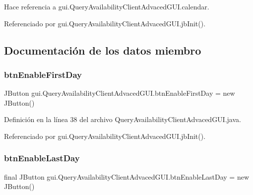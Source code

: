 Hace referencia a gui.\+Query\+Availability\+Client\+Advaced\+G\+U\+I.\+calendar.



Referenciado por gui.\+Query\+Availability\+Client\+Advaced\+G\+U\+I.\+jb\+Init().



\subsection{Documentación de los datos miembro}
\mbox{\label{classgui_1_1_query_availability_client_advaced_g_u_i_a8e949d79027650d99ede8ae5b7c59887}} 
\subsubsection{\texorpdfstring{btnEnableFirstDay}{btnEnableFirstDay}}
{\footnotesize\ttfamily J\+Button gui.\+Query\+Availability\+Client\+Advaced\+G\+U\+I.\+btn\+Enable\+First\+Day = new J\+Button()\hspace{0.3cm}{\ttfamily [private]}}



Definición en la línea 38 del archivo Query\+Availability\+Client\+Advaced\+G\+U\+I.\+java.



Referenciado por gui.\+Query\+Availability\+Client\+Advaced\+G\+U\+I.\+jb\+Init().

\mbox{\label{classgui_1_1_query_availability_client_advaced_g_u_i_ac84a7f02ee36671fdcf19c79cef949ef}} 
\subsubsection{\texorpdfstring{btnEnableLastDay}{btnEnableLastDay}}
{\footnotesize\ttfamily final J\+Button gui.\+Query\+Availability\+Client\+Advaced\+G\+U\+I.\+btn\+Enable\+Last\+Day = new J\+Button()\hspace{0.3cm}{\ttfamily [private]}}




